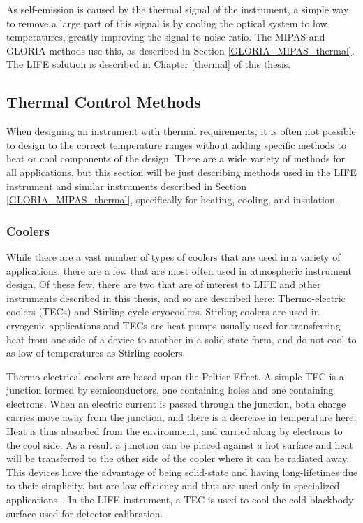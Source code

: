 As self-emission is caused by the thermal signal of the instrument, a simple way to remove a large part of this signal is by cooling the optical system to low temperatures, greatly improving the signal to noise ratio. The MIPAS and GLORIA methods use this, as described in Section \ref{GLORIA_MIPAS_thermal}. The LIFE solution is described in Chapter \ref{thermal} of this thesis.

\subsection{Thermal Control Methods} \label{Thermal_methods} %
When designing an instrument with thermal requirements, it is often not possible to design to the correct temperature ranges without adding specific methods to heat or cool components of the design. There are a wide variety of methods for all applications, but this section will be just describing methods used in the LIFE instrument and similar instruments described in Section \ref{GLORIA_MIPAS_thermal}, specifically for heating, cooling, and insulation.

\subsubsection{Coolers}

While there are a vast number of types of coolers that are used in a variety of applications, there are a few that are most often used in atmospheric instrument design. Of these few, there are two that are of interest to LIFE and other instruments described in this thesis, and so are described here: Thermo-electric coolers (TECs) and Stirling cycle cryocoolers. Stirling coolers are used in cryogenic applications and TECs are heat pumps usually used for transferring heat from one side of a device to another in a solid-state form, and do not cool to as low of temperatures as Stirling coolers.

Thermo-electrical coolers are based upon the Peltier Effect. A simple TEC is a junction formed by semiconductors, one containing holes and one containing electrons. When an electric current is passed through the junction, both charge carries move away from the junction, and there is a decrease in temperature here. Heat is thus absorbed from the environment, and carried along by electrons to the cool side. As a result a junction can be placed against a hot surface and heat will be transferred to the other side of the cooler where it can be radiated away. This devices have the advantage of being solid-state and having long-lifetimes due to their simplicity, but are low-efficiency and thus are used only in specialized applications~\citep{TE_coolers}. In the LIFE instrument, a TEC is used to cool the cold blackbody surface used for detector calibration.

